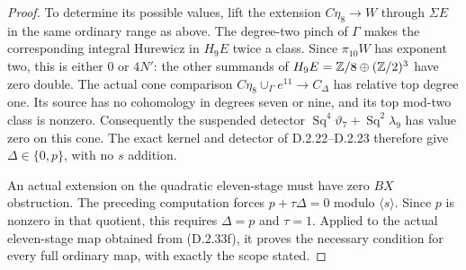 \begin{proof}
To determine its possible values, lift the extension
$C\eta_8\to W$ through $\Sigma E$ in the same ordinary
range as above. The degree-two pinch of $\Gamma$ makes
the corresponding integral Hurewicz in $H_9E$ twice a
class. Since $\pi_{10}W$ has exponent two, this is either
$0$ or $4N'$: the other summands of
$H_9E=\mathbb Z/8\oplus(\mathbb Z/2)^3$ have zero double.
The actual cone comparison
$C\eta_8\cup_\Gamma e^{11}\to C_\Delta$ has relative
top degree one. Its source has no cohomology in degrees
seven or nine, and its top mod-two class is nonzero.
Consequently the suspended detector
$\operatorname{Sq}^4\vartheta_7+
\operatorname{Sq}^2\lambda_9$ has value zero on this cone.
The exact kernel and detector of \textup{D.2.22--D.2.23}
therefore give $\Delta\in\{0,p\}$, with no $s$ addition.

An actual extension on the quadratic eleven-stage must
have zero $BX$ obstruction. The preceding computation
forces $p+\tau\Delta=0$ modulo $\langle s\rangle$.
Since $p$ is nonzero in that quotient, this requires
$\Delta=p$ and $\tau=1$. Applied to the actual
eleven-stage map obtained from \textup{(D.2.33f)}, it proves
the necessary condition for every full ordinary map,
with exactly the scope stated.
\end{proof}
